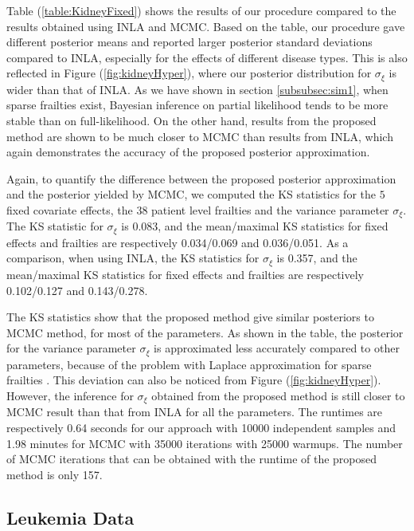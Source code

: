 \documentclass[ba]{imsart}
\begin{document}
Table (\ref{table:KidneyFixed}) shows the results of our procedure compared to the results obtained using INLA and MCMC. Based on the table, our procedure gave different posterior means and reported larger posterior standard deviations compared to INLA, especially for the effects of different disease types. This is also reflected in Figure (\ref{fig:kidneyHyper}), where our posterior distribution for $\sigma_{\xi}$ is wider than that of INLA. As we have shown in section \ref{subsubsec:sim1}, when sparse frailties exist, Bayesian inference on partial likelihood tends to be more stable than on full-likelihood. On the other hand, results from the proposed method are shown to be much closer to MCMC than results from INLA, which again demonstrates the accuracy of the proposed posterior approximation.

Again, to quantify the difference between the proposed posterior approximation and the posterior yielded by MCMC, we computed the KS statistics for the $5$ fixed covariate effects, the $38$ patient level frailties and the variance parameter $\sigma_\xi$. The KS statistic for $\sigma_\xi$ is 0.083, and the mean/maximal KS statistics for fixed effects and frailties are respectively 0.034/0.069 and 0.036/0.051. 
As a comparison, when using INLA, the KS statistics for $\sigma_\xi$ is 0.357, and the mean/maximal KS statistics for fixed effects and frailties are respectively 0.102/0.127 and 0.143/0.278.

The KS statistics show that the proposed method give similar posteriors to MCMC method, for most of the parameters. As shown in the table, the posterior for the variance parameter $\sigma_\xi$ is approximated less accurately compared to other parameters, because of the problem with Laplace approximation for sparse frailties \citep{Ogden2013ASR}. This deviation can also be noticed from Figure (\ref{fig:kidneyHyper}). However, the inference for $\sigma_\xi$ obtained from the proposed method is still closer to MCMC result than that from INLA for all the parameters. The runtimes are respectively 0.64 seconds for our approach with 10000 independent samples and 1.98 minutes for MCMC with 35000 iterations with 25000 warmups. The number of MCMC iterations that can be obtained with the runtime of the proposed method is only 157.


\subsection{Leukemia Data}\label{subsec:leuk}
\end{document}
